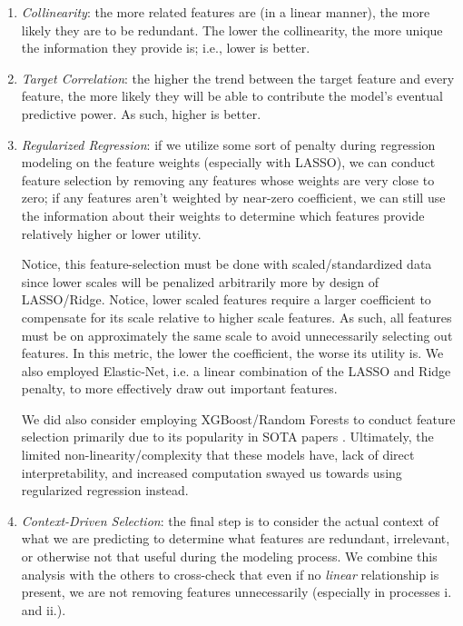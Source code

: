 \documentclass[conference]{IEEEtran}
\begin{document}
    \begin{enumerate}[label=\roman*.]
        \item \textit{Collinearity}: the more related features are (in a linear manner), the more likely they are to be redundant. The lower the collinearity, the more unique the information they provide is; i.e., lower is better.
        
        \item \textit{Target Correlation}: the higher the trend between the target feature and every feature, the more likely they will be able to contribute the model’s eventual predictive power. As such, higher is better.
        
        \item \textit{Regularized Regression}: if we utilize some sort of penalty during regression modeling on the feature weights (especially with LASSO), we can conduct feature selection by removing any features whose weights are very close to zero; if any features aren’t weighted by near-zero coefficient, we can still
        use the information about their weights to determine which features provide relatively higher or lower utility. 
        
        Notice, this feature-selection must be done with scaled/standardized data since lower scales will be penalized arbitrarily more by design of LASSO/Ridge. Notice, lower scaled features require a larger coefficient to compensate for its scale relative to higher scale features. As such, all features must be on approximately the same scale to avoid unnecessarily selecting out features. In this metric, the lower the coefficient, the worse its utility is. We also employed Elastic-Net, i.e. a linear combination of the LASSO and Ridge penalty, to  more effectively draw out important features.
        
        We did also consider employing XGBoost/Random Forests to conduct feature selection primarily due to its popularity in SOTA papers \cite{b7}. Ultimately, the limited non-linearity/complexity that these models have, lack of direct interpretability, and increased computation swayed us towards using regularized regression instead.
        
        \item \textit{Context-Driven Selection}: the final step is to consider the actual context of what we are predicting to determine what features are redundant, irrelevant, or otherwise not that  useful during the modeling process. We combine this analysis with the others to cross-check that even if no \textit{linear} relationship is present, we are not removing features unnecessarily (especially in processes i. and ii.). 
        
    \end{enumerate}
    
\end{document}
